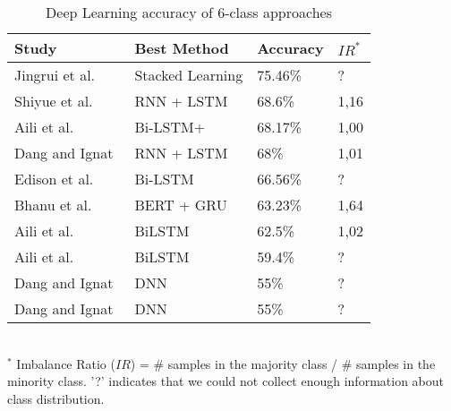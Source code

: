 \begin{table}[ht]
    \caption{Deep Learning accuracy of 6-class approaches}
    \label{tab:DL_performance_6class}
    \centering
    \begin{tabular}{l l l l}
        \toprule
        \textbf{Study} & \textbf{Best Method} & \textbf{Accuracy} & \textbf{$IR^*$}\\ 
        \midrule
        Jingrui et al.~\cite{Hou2021_lr122} & Stacked Learning & 75.46\% & ? \\
        Shiyue et al.~\cite{Zhang2018_lr41} & RNN + LSTM & 68.6\% & 1,16 \\
        Aili et al.~\cite{Shen2017_lr31} & Bi-LSTM+ & 68.17\% & 1,00 \\
        Dang and Ignat~\cite{Dang2017_lr23} & RNN + LSTM & 68\% & 1,01 \\
        Edison et al.~\cite{Marrese-Taylor2019_lr85} & Bi-LSTM & 66.56\% & ? \\
        Bhanu et al.~\cite{Guda2020_lr38} & BERT + GRU & 63.23\% & 1,64 \\
        Aili et al.~\cite{Shen2020_lr2009} & BiLSTM & 62.5\% & 1,02 \\
        Aili et al.~\cite{Shen2019_lr1061} & BiLSTM & 59.4\% & ? \\
        Dang and Ignat~\cite{Dang2016_lr24} & DNN & 55\% & ? \\
        Dang and Ignat~\cite{Dang2016_lr89} & DNN & 55\% & ? \\
        \bottomrule
    \end{tabular}
    \\ \vspace{0.1cm}
    \footnotesize
    $^*$ Imbalance Ratio ($IR$) = \# samples in the majority class / \# samples in the minority class. '?' indicates that we could not collect enough information about class distribution.
\end{table}